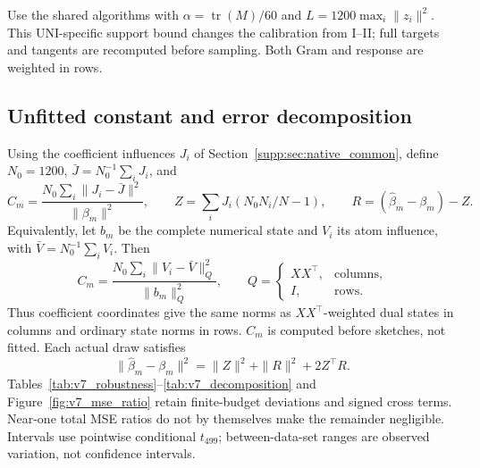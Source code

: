\documentclass[11pt,a4paper,leqno]{article}
\numberwithin{equation}{section}
\numberwithin{figure}{section}
\numberwithin{table}{section}
\theoremstyle{plain}
\theoremstyle{definition}
\theoremstyle{remark}
\begin{document}
Use the shared algorithms with $\alpha=\operatorname{tr}(M)/60$ and
$L=1200\max_i\|z_i\|^2$. This UNI-specific support bound changes the
calibration from I--II; full targets and tangents are recomputed before
sampling. Both Gram and response are weighted in rows.

\subsection{Unfitted constant and error decomposition}
Using the coefficient influences $J_i$ of
Section~\ref{supp:sec:native_common}, define $N_0 =1200$,
$\bar J=N_0 ^{-1}\sum_iJ_i$, and
\[
 C_m=\frac{N_0 \sum_i\|J_i-\bar J\|^2}{\|\beta_m\|^2},\qquad
 Z=\sum_iJ_i(N_0 N_i/N-1),\qquad
 R=(\widehat\beta_m-\beta_m)-Z.
\]
Equivalently, let $b_m$ be the complete numerical state and $V_i$
its atom influence, with $\bar V=N_0^{-1}\sum_iV_i$.
Then
\[
 C_m=\frac{N_0\sum_i\|V_i-\bar V\|_Q^2}{\|b_m\|_Q^2},
 \qquad Q=\begin{cases}XX^\top,&\text{columns},\\I,&\text{rows}.\end{cases}
\]
Thus coefficient coordinates give the same norms as $XX^\top$-weighted
dual states in columns and ordinary state norms in rows. $C_m$ is computed
before sketches, not fitted. Each actual draw satisfies
\[
 \|\widehat\beta_m-\beta_m\|^2=\|Z\|^2+\|R\|^2+2Z^\top R.
\]
Tables~\ref{tab:v7_robustness}--\ref{tab:v7_decomposition} and
Figure~\ref{fig:v7_mse_ratio} retain finite-budget deviations and signed
cross terms. Near-one total MSE ratios do not by themselves make the
remainder negligible. Intervals use pointwise conditional $t_{499}$;
between-data-set ranges are observed variation, not confidence intervals.
\end{document}
